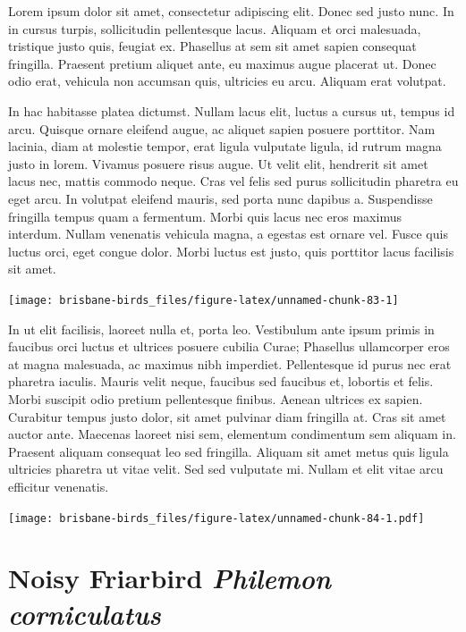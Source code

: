 \documentclass[]{book}
\let\origfigure\figure
\let\endorigfigure\endfigure
\renewenvironment{figure}[1][2] {
  \expandafter\origfigure\expandafter[H]
} {
  \endorigfigure
}
\begin{document}
Lorem ipsum dolor sit amet, consectetur adipiscing elit. Donec sed justo
nunc. In in cursus turpis, sollicitudin pellentesque lacus. Aliquam et
orci malesuada, tristique justo quis, feugiat ex. Phasellus at sem sit
amet sapien consequat fringilla. Praesent pretium aliquet ante, eu
maximus augue placerat ut. Donec odio erat, vehicula non accumsan quis,
ultricies eu arcu. Aliquam erat volutpat.

In hac habitasse platea dictumst. Nullam lacus elit, luctus a cursus ut,
tempus id arcu. Quisque ornare eleifend augue, ac aliquet sapien posuere
porttitor. Nam lacinia, diam at molestie tempor, erat ligula vulputate
ligula, id rutrum magna justo in lorem. Vivamus posuere risus augue. Ut
velit elit, hendrerit sit amet lacus nec, mattis commodo neque. Cras vel
felis sed purus sollicitudin pharetra eu eget arcu. In volutpat eleifend
mauris, sed porta nunc dapibus a. Suspendisse fringilla tempus quam a
fermentum. Morbi quis lacus nec eros maximus interdum. Nullam venenatis
vehicula magna, a egestas est ornare vel. Fusce quis luctus orci, eget
congue dolor. Morbi luctus est justo, quis porttitor lacus facilisis sit
amet.

\begin{figure}
\texttt{[image: brisbane-birds\_files/figure-latex/unnamed-chunk-83-1]} \caption{insert figure caption}\label{fig:unnamed-chunk-83}
\end{figure}

In ut elit facilisis, laoreet nulla et, porta leo. Vestibulum ante ipsum
primis in faucibus orci luctus et ultrices posuere cubilia Curae;
Phasellus ullamcorper eros at magna malesuada, ac maximus nibh
imperdiet. Pellentesque id purus nec erat pharetra iaculis. Mauris velit
neque, faucibus sed faucibus et, lobortis et felis. Morbi suscipit odio
pretium pellentesque finibus. Aenean ultrices ex sapien. Curabitur
tempus justo dolor, sit amet pulvinar diam fringilla at. Cras sit amet
auctor ante. Maecenas laoreet nisi sem, elementum condimentum sem
aliquam in. Praesent aliquam consequat leo sed fringilla. Aliquam sit
amet metus quis ligula ultricies pharetra ut vitae velit. Sed sed
vulputate mi. Nullam et elit vitae arcu efficitur venenatis.

\begin{figure}
\centering
\texttt{[image: brisbane-birds\_files/figure-latex/unnamed-chunk-84-1.pdf]}
\caption{\label{fig:unnamed-chunk-84}insert figure caption}
\end{figure}

\section{\texorpdfstring{Noisy Friarbird \emph{Philemon
corniculatus}}{Noisy Friarbird Philemon corniculatus}}\label{noisy-friarbird-philemon-corniculatus}
\end{document}
